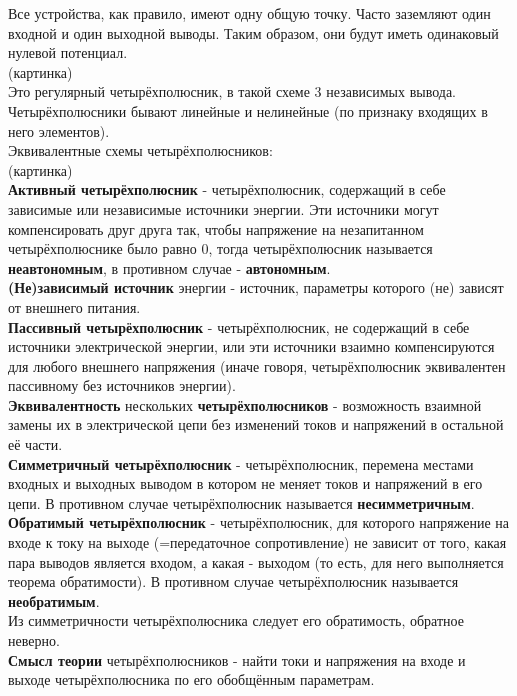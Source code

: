 \documentclass[a4paper,12pt]{report}
\begin{document}
Все устройства, как правило, имеют одну общую точку. Часто заземляют один входной и один выходной выводы. Таким образом, они будут иметь одинаковый нулевой потенциал.\\
(картинка)\\
Это регулярный четырёхполюсник, в такой схеме 3 независимых вывода.\\
Четырёхполюсники бывают линейные и нелинейные (по признаку входящих в него элементов).\\
Эквивалентные схемы четырёхполюсников:\\
(картинка)\\
\textbf{Активный четырёхполюсник} - четырёхполюсник, содержащий в себе зависимые или независимые источники энергии. Эти источники могут компенсировать друг друга так, чтобы напряжение на незапитанном четырёхполюснике было равно 0, тогда четырёхполюсник называется \textbf{неавтономным}, в противном случае - \textbf{автономным}.\\
\textbf{(Не)зависимый источник} энергии - источник, параметры которого (не) зависят от внешнего питания.\\
\textbf{Пассивный четырёхполюсник} - четырёхполюсник, не содержащий в себе источники электрической энергии, или эти источники взаимно компенсируются для любого внешнего напряжения (иначе говоря, четырёхполюсник эквивалентен пассивному без источников энергии).\\
\textbf{Эквивалентность} нескольких \textbf{четырёхполюсников} - возможность взаимной замены их в электрической цепи без изменений токов и напряжений в остальной её части.\\
\textbf{Симметричный четырёхполюсник} - четырёхполюсник, перемена местами входных и выходных выводом в котором не меняет токов и напряжений в его цепи. В противном случае четырёхполюсник называется \textbf{несимметричным}.\\
\textbf{Обратимый четырёхполюсник} - четырёхполюсник, для которого напряжение на входе к току на выходе (=передаточное сопротивление) не зависит от того, какая пара выводов является входом, а какая - выходом (то есть, для него выполняется теорема обратимости). В противном случае четырёхполюсник называется \textbf{необратимым}.\\
Из симметричности четырёхполюсника следует его обратимость, обратное неверно.\\
\textbf{Смысл теории} четырёхполюсников - найти токи и напряжения на входе и выходе четырёхполюсника по его обобщённым параметрам.\\
\end{document}
